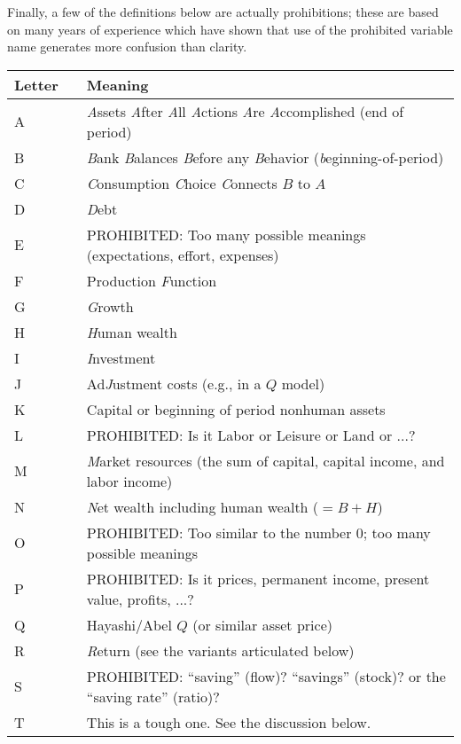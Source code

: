 \documentclass[12pt]{\econtex}
\begin{document}
Finally, a few of the definitions below are actually prohibitions; these are based on many years of experience which have shown that use of the prohibited variable name generates more confusion than clarity.

\hypertarget{RomanLetters}{}
\begin{table}[ht]
  \centering
  \begin{tabular}{|lcl|}   \hline
    Letter & & Meaning
    \\ \hline
    A & & \textit{A}ssets \textit{A}fter \textit{A}ll \textit{A}ctions \textit{A}re \textit{A}ccomplished (end of period)\\
    B & & \textit{B}ank \textit{B}alances \textit{B}efore any \textit{B}ehavior (\textit{b}eginning-of-period)\\
    C & & \textit{C}onsumption \textit{C}hoice \textit{C}onnects $B$ to $A$\\
    D & & \textit{D}ebt\\
    E & & PROHIBITED:  Too many possible meanings (expectations, effort, expenses)\\
    F & & Production \textit{F}unction\\
    G & & \textit{G}rowth\\
    H & & \textit{H}uman wealth\\
    I & & \textit{I}nvestment\\
    J & & Ad\textit{J}ustment costs (e.g., in a $Q$ model)\\
    K & & Capital or beginning of period nonhuman assets\\
    L & & PROHIBITED: Is it Labor or Leisure or Land or ...?\\
    M & & \textit{M}arket resources (the sum of capital, capital income, and labor income)\\
    N & & \textit{N}et wealth including human wealth ($=B + H$)\\
    O & & PROHIBITED: Too similar to the number 0; too many possible meanings\\
    P & & PROHIBITED: Is it prices, permanent income, present value, profits, ...?\\
    Q & & Hayashi/Abel $Q$ (or similar asset price)\\
    R & & \textit{R}eturn (see the variants articulated below)\\
    S & & PROHIBITED: ``saving'' (flow)? ``savings'' (stock)? or the ``saving rate'' (ratio)?\\
    T & & This is a tough one.  See the discussion below.\\

\end{tabular}
\end{table}
\end{document}
